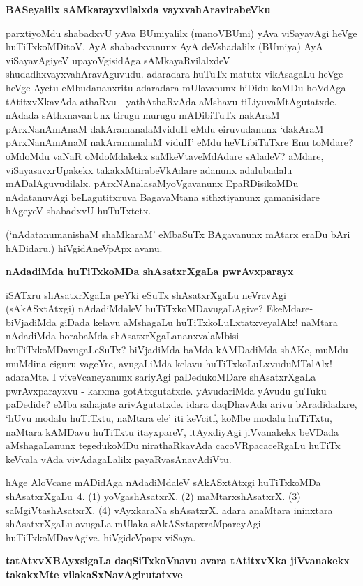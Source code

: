 {\bigskip
\noindent
{\large\bf BASeyalilx sAMkarayxvilalxda vayxvahAravirabeVku}}\label{page174a}
\medskip

\noindent
parxtiyoMdu shabadxvU yAva BUmiyalilx (manoVBUmi) yAva viSayavAgi heVge huTiTxkoMDitoV, AyA shabadxvanunx AyA deVshadalilx \hbox{(BUmiya)} AyA viSayavAgiyeV upayoVgisidAga sAMkayaRvilalxdeV shudadhxvayxvahAravAguvudu. adaradara huTuTx matutx vikAsagaLu heVge heVge Ayetu eMbudananxritu adaradara mUlavanunx hiDidu koMDu hoVdAga tAtitxvXkavAda athaRvu - yathAthaRvAda aMshavu tiLiyuvaMtAgutatxde. nAdada sAthxnavanUnx tirugu murugu mADibiTuTx nakAraM pArxNanAmAnaM dakAramanalaMviduH eMdu eiruvudanunx `dakAraM pArxNanAmAnaM nakAramanalaM viduH' eMdu heVLibiTaTxre Enu toMdare? oMdoMdu vaNaR oMdoMdakekx saMkeVtaveMdAdare sAladeV? aMdare, viSayasavxrUpakekx takakxMtirabeVkAdare adanunx adalubadalu mADalAguvudilalx. pArxNAnalasaMyoVgavanunx EpaRDisikoMDu nAdatanuvAgi beLagutitxruva BagavaMtana sithxtiyanunx gamanisidare hAgeyeV shabadxvU huTuTxtetx.

(`nAdatanumanishaM shaMkaraM' eMbaSuTx BAgavanunx mAtarx eraDu bAri hADidaru.) hiVgidAneVpApx avanu.

{\bigskip
\noindent
{\large\bf nAdadiMda huTiTxkoMDa shAsatxrXgaLa pwrAvxparayx}}
\medskip

\noindent
iSATxru shAsatxrXgaLa peYki eSuTx shAsatxrXgaLu neVravAgi (sAkASxtAtxgi) nAdadiMdaleV huTiTxkoMDavugaLAgive? EkeMdare- biVjadiMda giDada kelavu aMshagaLu huTiTxkoLuLxtatxveyalAlx! naMtara nAdadiMda horabaMda shAsatxrXgaLananxvalaMbisi huTiTxkoMDavugaLeSuTx? biVjadiMda baMda kAMDadiMda shAKe, muMdu \hbox{muMdina} ciguru vageYre, avugaLiMda kelavu huTiTxkoLuLxvuduMTalAlx! adaraMte. I viveVcaneyanunx sariyAgi paDedukoMDare shAsatxrXgaLa pwrAvxparayxvu - karxma gotAtxgutatxde. yAvudariMda yAvudu guTuku paDedide? eMba sahajate arivAgutatxde. idara daqDhavAda arivu bAradidadxre, `hUvu modalu huTiTxtu, naMtara ele' iti keVcitf, koMbe modalu huTiTxtu, naMtara kAMDavu huTiTxtu itayxpareV, itAyxdiyAgi jiVvanakekx beVDada aMshagaLanunx tegedukoMDu nirathaRkavAda cacoVRpacaceRgaLu huTiTx keVvala vAda vivAdagaLalilx payaRvasAnavAdiVtu.

hAge AloVcane mADidAga nAdadiMdaleV sAkASxtAtxgi huTiTxkoMDa shAsatxrXgaLu~4. (1) yoVgashAsatxrX. (2) maMtarxshAsatxrX. (3) saMgiVtashAsatxrX. (4) vAyxkaraNa shAsatxrX. adara anaMtara ininxtara shAsatxrXgaLu avugaLa mUlaka sAkASxtapxraMpareyAgi huTiTxkoMDavAgive. hiVgideVpapx viSaya.

{\bigskip
\noindent
{\large\bf tatAtxvXBAyxsigaLa daqSiTxkoVnavu avara tAtitxvXka jiVvanakekx takakxMte vilakaSxNavAgirutatxve}}\label{page175}
\medskip

